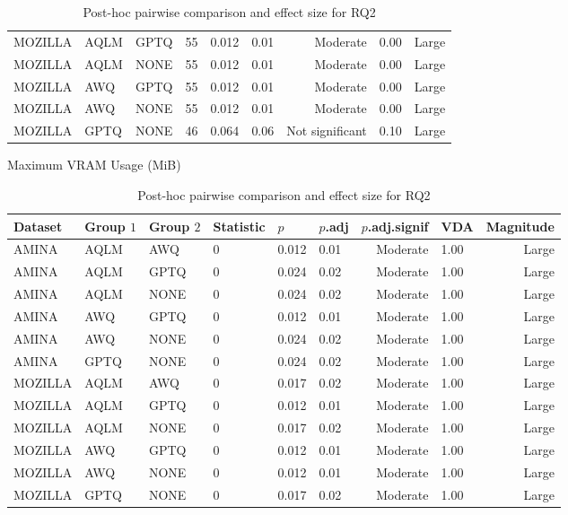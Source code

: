 \begin{table}[ht]
\begin{subtable}[t]{0.48\textwidth}
\begin{tabular}{llllllrlr}
    MOZILLA & AQLM & GPTQ & 55 & 0.012 & 0.01 & Moderate & 0.00 & Large \\
    MOZILLA & AQLM & NONE & 55 & 0.012 & 0.01 & Moderate & 0.00 & Large \\
    MOZILLA & AWQ & GPTQ & 55 & 0.012 & 0.01 & Moderate & 0.00 & Large \\
    MOZILLA & AWQ & NONE & 55 & 0.012 & 0.01 & Moderate & 0.00 & Large \\
    MOZILLA & GPTQ & NONE & 46 & 0.064 & 0.06 & Not significant & 0.10 & Large \\
    \bottomrule
    \end{tabular}
\end{subtable}
\hfill
\begin{subtable}[t]{0.48\textwidth}
    \caption{Maximum VRAM Usage (MiB)}
    \begin{tabular}{llllllrlr}
    \toprule
    Dataset & Group $1$ & Group $2$ & Statistic & $p$ & $p$.adj & $p$.adj.signif & VDA & Magnitude \\
    \midrule
    AMINA & AQLM & AWQ & 0 & 0.012 & 0.01 & Moderate & 1.00 & Large \\
    AMINA & AQLM & GPTQ & 0 & 0.024 & 0.02 & Moderate & 1.00 & Large \\
    AMINA & AQLM & NONE & 0 & 0.024 & 0.02 & Moderate & 1.00 & Large \\
    AMINA & AWQ & GPTQ & 0 & 0.012 & 0.01 & Moderate & 1.00 & Large \\
    AMINA & AWQ & NONE & 0 & 0.024 & 0.02 & Moderate & 1.00 & Large \\
    AMINA & GPTQ & NONE & 0 & 0.024 & 0.02 & Moderate & 1.00 & Large \\
    MOZILLA & AQLM & AWQ & 0 & 0.017 & 0.02 & Moderate & 1.00 & Large \\
    MOZILLA & AQLM & GPTQ & 0 & 0.012 & 0.01 & Moderate & 1.00 & Large \\
    MOZILLA & AQLM & NONE & 0 & 0.017 & 0.02 & Moderate & 1.00 & Large \\
    MOZILLA & AWQ & GPTQ & 0 & 0.012 & 0.01 & Moderate & 1.00 & Large \\
    MOZILLA & AWQ & NONE & 0 & 0.012 & 0.01 & Moderate & 1.00 & Large \\
    MOZILLA & GPTQ & NONE & 0 & 0.017 & 0.02 & Moderate & 1.00 & Large \\
    \bottomrule
    \end{tabular}
\end{subtable}

\caption{Post-hoc pairwise comparison and effect size for RQ2}
\label{tab:R2_posthoc_full}
\end{table}
